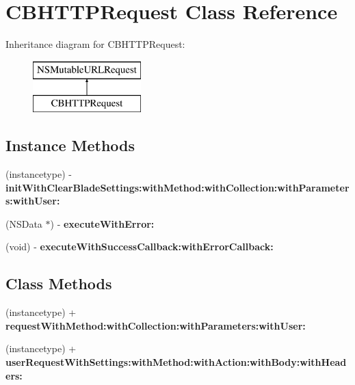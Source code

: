 \hypertarget{interface_c_b_h_t_t_p_request}{\section{C\+B\+H\+T\+T\+P\+Request Class Reference}
\label{interface_c_b_h_t_t_p_request}
}
Inheritance diagram for C\+B\+H\+T\+T\+P\+Request\+:\begin{figure}[H]
\begin{center}
\leavevmode
\includegraphics[height=2.000000cm]{interface_c_b_h_t_t_p_request}
\end{center}
\end{figure}
\subsection*{Instance Methods}
\begin{DoxyCompactItemize}
\item 
\hypertarget{interface_c_b_h_t_t_p_request_a2053e38ef61e8235127755881330f944}{(instancetype) -\/ {\bfseries init\+With\+Clear\+Blade\+Settings\+:with\+Method\+:with\+Collection\+:with\+Parameters\+:with\+User\+:}}\label{interface_c_b_h_t_t_p_request_a2053e38ef61e8235127755881330f944}

\item 
\hypertarget{interface_c_b_h_t_t_p_request_a69d8aa14a2fd7ac624c1a2a220a426b9}{(N\+S\+Data $\ast$) -\/ {\bfseries execute\+With\+Error\+:}}\label{interface_c_b_h_t_t_p_request_a69d8aa14a2fd7ac624c1a2a220a426b9}

\item 
\hypertarget{interface_c_b_h_t_t_p_request_ad5c510894450d80dc40f9ff0d23df048}{(void) -\/ {\bfseries execute\+With\+Success\+Callback\+:with\+Error\+Callback\+:}}\label{interface_c_b_h_t_t_p_request_ad5c510894450d80dc40f9ff0d23df048}

\end{DoxyCompactItemize}
\subsection*{Class Methods}
\begin{DoxyCompactItemize}
\item 
\hypertarget{interface_c_b_h_t_t_p_request_acb09f64190f8a279405d1fa1bc62bb6d}{(instancetype) + {\bfseries request\+With\+Method\+:with\+Collection\+:with\+Parameters\+:with\+User\+:}}\label{interface_c_b_h_t_t_p_request_acb09f64190f8a279405d1fa1bc62bb6d}

\item 
\hypertarget{interface_c_b_h_t_t_p_request_a6e8528264293eccf7256128a2e46dff2}{(instancetype) + {\bfseries user\+Request\+With\+Settings\+:with\+Method\+:with\+Action\+:with\+Body\+:with\+Headers\+:}}\label{interface_c_b_h_t_t_p_request_a6e8528264293eccf7256128a2e46dff2}

\end{DoxyCompactItemize}
